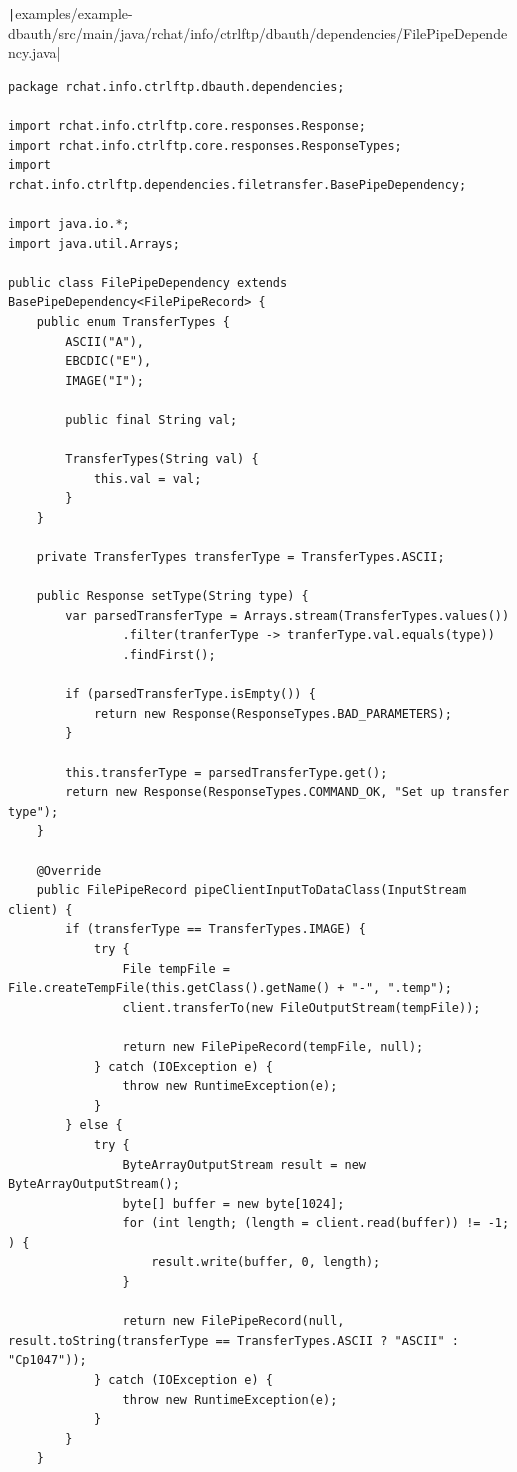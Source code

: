\documentclass[a4paper,14pt]{extarticle}
\begin{document}
\texttt|examples/example-dbauth/src/main/java/rchat/info/ctrlftp/dbauth/dependencies/FilePipeDependency.java|
\begin{verbatim}
package rchat.info.ctrlftp.dbauth.dependencies;

import rchat.info.ctrlftp.core.responses.Response;
import rchat.info.ctrlftp.core.responses.ResponseTypes;
import rchat.info.ctrlftp.dependencies.filetransfer.BasePipeDependency;

import java.io.*;
import java.util.Arrays;

public class FilePipeDependency extends BasePipeDependency<FilePipeRecord> {
    public enum TransferTypes {
        ASCII("A"),
        EBCDIC("E"),
        IMAGE("I");

        public final String val;

        TransferTypes(String val) {
            this.val = val;
        }
    }

    private TransferTypes transferType = TransferTypes.ASCII;

    public Response setType(String type) {
        var parsedTransferType = Arrays.stream(TransferTypes.values())
                .filter(tranferType -> tranferType.val.equals(type))
                .findFirst();

        if (parsedTransferType.isEmpty()) {
            return new Response(ResponseTypes.BAD_PARAMETERS);
        }

        this.transferType = parsedTransferType.get();
        return new Response(ResponseTypes.COMMAND_OK, "Set up transfer type");
    }

    @Override
    public FilePipeRecord pipeClientInputToDataClass(InputStream client) {
        if (transferType == TransferTypes.IMAGE) {
            try {
                File tempFile = File.createTempFile(this.getClass().getName() + "-", ".temp");
                client.transferTo(new FileOutputStream(tempFile));

                return new FilePipeRecord(tempFile, null);
            } catch (IOException e) {
                throw new RuntimeException(e);
            }
        } else {
            try {
                ByteArrayOutputStream result = new ByteArrayOutputStream();
                byte[] buffer = new byte[1024];
                for (int length; (length = client.read(buffer)) != -1; ) {
                    result.write(buffer, 0, length);
                }

                return new FilePipeRecord(null, result.toString(transferType == TransferTypes.ASCII ? "ASCII" : "Cp1047"));
            } catch (IOException e) {
                throw new RuntimeException(e);
            }
        }
    }


\end{verbatim}
\end{document}

